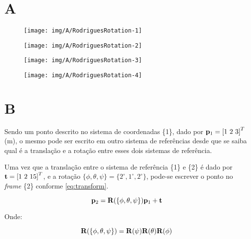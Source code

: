 
\section{A}

\begin{figure}[H]
	\centering
	\texttt{[image: img/A/RodriguesRotation-1]}
	\label{fig:rodriguesrotation-2}
\end{figure}

\begin{figure}[H]
	\centering
	\texttt{[image: img/A/RodriguesRotation-2]}
	\label{fig:rodriguesrotation-3}
\end{figure}

\begin{figure}[H]
	\centering
	\texttt{[image: img/A/RodriguesRotation-3]}
	\label{fig:rodriguesrotation-4}
\end{figure}

\begin{figure}[H]
	\centering
	\texttt{[image: img/A/RodriguesRotation-4]}
	\label{fig:rodriguesrotation-1}
\end{figure}



\section{B}

Sendo um ponto descrito no sistema de coordenadas \{1\}, dado por $\mathbf{p}_1 = \left[ 1 \ 2 \ 3 \right]^T$ (m), o mesmo pode ser escrito em outro sistema de referências desde que se saiba qual é a translação e a rotação entre esses dois sistemas de referência.

Uma vez que a translação entre o sistema de referência \{1\} e \{2\} é dado por $\mathbf{t} = \left[1 \ 2 \ 15 \right]^T$, e a rotação $\{\phi, \theta, \psi\} = \{2^\circ, 1^\circ, 2^\circ\}$, pode-se escrever o ponto no \textit{frame} \{2\} conforme \eqref{eq:transform}.

\begin{equation}\label{eq:transform}
	\mathbf{p}_2 = \mathbf{R}(\{\phi, \theta, \psi\})\mathbf{p}_1 + \mathbf{t}
\end{equation}

Onde:

\begin{equation}\label{key}
	 \mathbf{R}(\{\phi, \theta, \psi\}) = \mathbf{R}(\psi) \mathbf{R}(\theta)  \mathbf{R}(\phi)
\end{equation}

